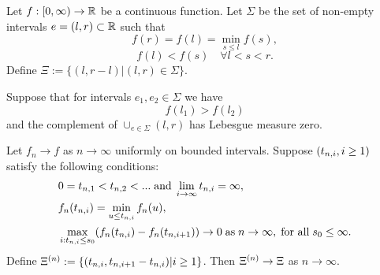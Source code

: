 



\begin{lemma}
Let $f:[0, \infty) \rightarrow \mathbb{R}$ be a continuous function. 
Let $\Sigma$ be the set of non-empty intervals 
$e=(l,r) \subset \mathbb{R}$
such that
\begin{equation} \label{E: cond 1}
f(r) = f(l) = \min_{s \leq l} f(s),
\end{equation}
\begin{equation} \label{E: cond 2}
f(l) < f(s) \quad \forall l < s < r.
\end{equation}
Define $\Xi := \lbrace (l, r-l) | (l, r) \in \Sigma \rbrace$.

Suppose that for intervals $e_1, e_2 \in \Sigma$ we have 
\begin{equation}
f(l_1) > f(l_2)
\end{equation}
and the complement of $\cup_{e \in \Sigma} (l,r)$ has Lebesgue measure zero.

Let $f_n \rightarrow f$ as $n \rightarrow \infty$ uniformly on bounded intervals.
Suppose $(t_{n, i}, i \geq 1)$ satisfy the following conditions:
\begin{align}
&0 = t_{n, 1} < t_{n, 2} < ... \; \text{and} \; \lim_{i \rightarrow \infty} t_{n, i} = \infty, \label{E: cond 3} \\ 
&f_n(t_{n, i}) = \min_{u \leq t_{n, i}}f_n(u), \label{E: cond 4} \\ 
&\max_{i: t_{n, i} \leq s_0}(f_n(t_{n, i}) - f_n(t_{n, i+1})) \rightarrow 0 \; \text{as} \; n \rightarrow \infty, \; \text{for all} \; s_0 \leq \infty. \label{E: cond 5}
\end{align}
Define $\Xi^{(n)} := \lbrace (t_{n, i}, t_{n, i+1} - t_{n, i}) | i \geq 1 \rbrace$.
Then $\Xi^{(n)} \rightarrow \Xi$ as $n \rightarrow \infty$.
\end{lemma}



